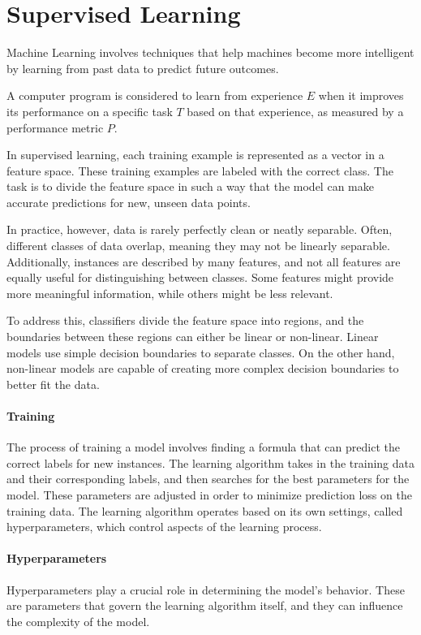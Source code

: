 \section{Supervised Learning}

Machine Learning involves techniques that help machines become more intelligent by learning from past data to predict future outcomes.
\begin{definition}
    A computer program is considered to learn from experience $E$ when it improves its performance on a specific task $T$ based on that experience, as measured by a performance metric $P$.
\end{definition}

In supervised learning, each training example is represented as a vector in a feature space. 
These training examples are labeled with the correct class. 
The task is to divide the feature space in such a way that the model can make accurate predictions for new, unseen data points.

In practice, however, data is rarely perfectly clean or neatly separable. Often, different classes of data overlap, meaning they may not be linearly separable. 
Additionally, instances are described by many features, and not all features are equally useful for distinguishing between classes. 
Some features might provide more meaningful information, while others might be less relevant.

To address this, classifiers divide the feature space into regions, and the boundaries between these regions can either be linear or non-linear. 
Linear models use simple decision boundaries to separate classes. 
On the other hand, non-linear models are capable of creating more complex decision boundaries to better fit the data.

\paragraph*{Training}
The process of training a model involves finding a formula that can predict the correct labels for new instances. 
The learning algorithm takes in the training data and their corresponding labels, and then searches for the best parameters for the model. 
These parameters are adjusted in order to minimize prediction loss on the training data.
The learning algorithm operates based on its own settings, called hyperparameters, which control aspects of the learning process.

\paragraph*{Hyperparameters}
Hyperparameters play a crucial role in determining the model's behavior. 
These are parameters that govern the learning algorithm itself, and they can influence the complexity of the model. 

